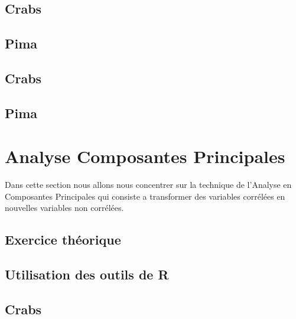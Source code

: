 \documentclass[]{report}
\begin{document}
\subsection{Crabs}

\subsection{Pima}

\subsection{Crabs}

\subsection{Pima}
\pagebreak

\section{Analyse Composantes Principales}
Dans cette section nous allons nous concentrer sur la technique de l’Analyse en Composantes Principales qui consiste a transformer des variables corrélées en nouvelles variables non corrélées.
 \subsection{Exercice théorique}
\subsection{Utilisation des outils de R}
\subsection{Crabs}
\end{document}
